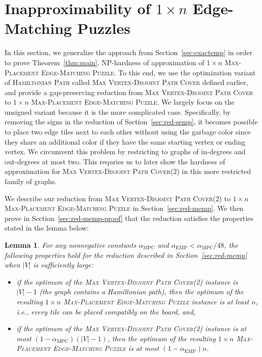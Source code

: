 \documentclass[11pt]{article}
\newtheorem{lemma}{Lemma}
\def\MPC{\mathrm{MPC}}
\def\EMP{\mathrm{EMP}}
\begin{document}
\section{Inapproximability of $1 \times n$ Edge-Matching Puzzles} \label{sec:emp}

In this section, we generalize the approach from Section~\ref{sec:exactemp} in order to prove Theorem~\ref{thm:main}, NP-hardness of approximation of \textsc{$1 \times n$ Max-Placement Edge-Matching Puzzle}. To this end, we use the optimization variant of \textsc{Hamiltonian Path} called \textsc{Max Vertex-Disjoint Path Cover} defined earlier, and provide a gap-preserving reduction from \textsc{Max Vertex-Disjoint Path Cover} to \textsc{$1 \times n$ Max-Placement Edge-Matching Puzzle}. We largely focus on the unsigned variant because it is the more complicated case. Specifically, by removing the signs in the reduction of Section~\ref{sec:red-semp}, it becomes possible to place two edge tiles next to each other without using the garbage color since they share an additional color if they have the same starting vertex or ending vertex. We circumvent this problem by restricting to graphs of in-degrees and out-degrees at most two. This requries us to later show the hardness of approximation for \textsc{Max Vertex-Disjoint Path Cover(2)} in this more restricted family of graphs.

We describe our reduction from \textsc{Max Vertex-Disjoint Path Cover(2)} to \textsc{$1\times n$ Max-Placement Edge-Matching Puzzle} in Section~\ref{sec:red-memp}. We then prove in Section~\ref{sec:red-memp-proof} that the reduction satisfies the properties stated in the lemma below:

\begin{lemma} \label{lem-emp-approx}
For any nonnegative constants $\alpha_{\MPC}$ and $\alpha_{\EMP} < \alpha_{\MPC} / 48$, the following properties hold for the reduction described in Section~\ref{sec:red-memp} when $|V|$ is sufficiently large:
\begin{itemize}
	\item if the optimum of the \textsc{Max Vertex-Disjoint Path Cover(2)} instance is $|V| - 1$ (the graph contains a Hamiltonian path), then the optimum of the resulting \textsc{$1 \times n$ Max-Placement Edge-Matching Puzzle} instance is at least $n$, i.e., every tile can be placed compatibly on the board, and,
	\item if the optimum of the \textsc{Max Vertex-Disjoint Path Cover(2)} instance is at most $(1-\alpha_{\MPC})(|V| - 1)$, then the optimum of the resulting \textsc{$1 \times n$ Max-Placement Edge-Matching Puzzle} is at most $(1-\alpha_{\EMP})n$.
\end{itemize}
\end{lemma}
\end{document}
